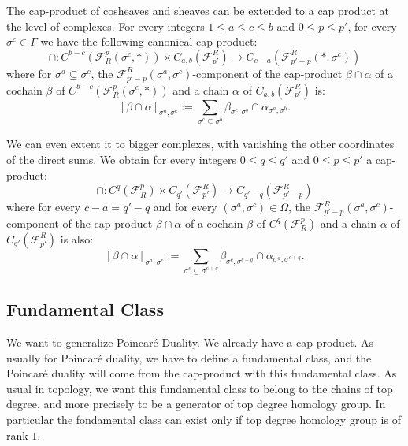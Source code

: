 \documentclass{article}
\begin{document}
The cap-product of cosheaves and sheaves can be extended to a cap product at the level of complexes. For every integers $1\leq a \leq c \leq b$ and $0 \leq p \leq p'$, for every $\sigma^c \in \Gamma$ we have the following canonical cap-product:
\begin{equation*}
    \cap: C^{b-c}(\mathcal{F}^{p}_R(\sigma^c,*)) \times C_{a,b}(\mathcal{F}_{p'}^R) \rightarrow C_{c-a}(\mathcal{F}_{p'-p}^R(*,\sigma^c))
\end{equation*}
where for $\sigma^a \subseteq \sigma^c$, the $\mathcal{F}_{p'-p}^R(\sigma^a,\sigma^c)$-component of the cap-product $\beta \cap \alpha$ of a cochain $\beta$ of $C^{b-c}(\mathcal{F}^{p}_R(\sigma^c,*))$ and a chain $\alpha$ of $C_{a,b}(\mathcal{F}_{p'}^R)$ is:
\begin{equation*}
    \left [ \beta \cap \alpha \right ]_{\sigma^a,\sigma^c}:= \sum_{\sigma^c \subseteq \sigma^b} \beta_{\sigma^c,\sigma^b} \cap \alpha_{\sigma^a,\sigma^b}.
\end{equation*}

We can even extent it to bigger complexes, with vanishing the other coordinates of the direct sums. We obtain for every integers $0\leq q \leq q'$ and $0\leq p \leq p'$ a cap-product:
\begin{equation*}
    \cap: C^{q}(\mathcal{F}^{p}_R) \times C_{q'}(\mathcal{F}_{p'}^R) \rightarrow C_{q'-q}(\mathcal{F}_{p'-p}^R)
\end{equation*}
where for every $c-a=q'-q$ and for every $(\sigma^a,\sigma^c) \in \Omega$, the $\mathcal{F}_{p'-p}^R(\sigma^a,\sigma^c)$-component of the cap-product $\beta \cap \alpha$ of a cochain $\beta$ of $C^{q}(\mathcal{F}^{p}_R)$ and a chain $\alpha$ of $C_{q'}(\mathcal{F}_{p'}^R)$ is also:
\begin{equation*}
    \left [ \beta \cap \alpha \right ]_{\sigma^a,\sigma^c}:= \sum_{\sigma^c \subseteq \sigma^{c+q}} \beta_{\sigma^c,\sigma^{c+q}} \cap \alpha_{\sigma^a,\sigma^{c+q}}.
\end{equation*}

\subsection{Fundamental Class}

We want to generalize Poincaré Duality. We already have a cap-product. As usually for Poincaré duality, we have to define a fundamental class, and the Poincaré duality will come from the cap-product with this fundamental class. As usual in topology, we want this fundamental class to belong to the chains of top degree, and more precisely to be a generator of top degree homology group. In particular the fondamental class can exist only if top degree homology group is of rank $1$.
\end{document}
